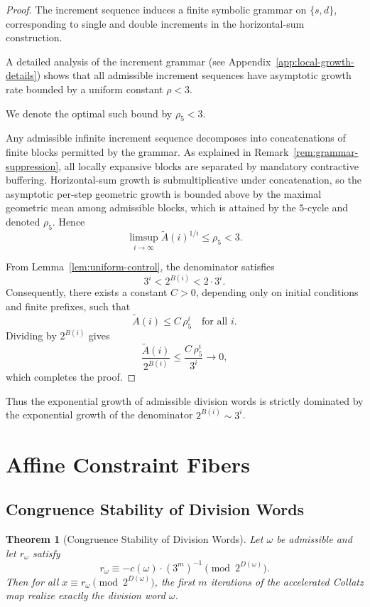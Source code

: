 \documentclass[12pt, oneside]{article}
\numberwithin{equation}{section}
\theoremstyle{definition}
\theoremstyle{plain}
\newtheorem{theorem}{Theorem}[section]
\theoremstyle{remark}
\begin{document}
\begin{proof}
The increment sequence  induces a finite symbolic grammar on $\{s,d\}$,
corresponding to single and double increments in the horizontal-sum construction.

A detailed analysis of the increment grammar (see Appendix~\ref{app:local-growth-details})
shows that all admissible increment sequences have asymptotic growth rate bounded by a
uniform constant $\rho < 3$.

We denote the optimal such bound by $\rho_5 < 3$.

Any admissible infinite increment sequence decomposes into concatenations of finite
blocks permitted by the grammar. As explained in Remark~\ref{rem:grammar-suppression},
all locally expansive blocks are separated by mandatory contractive buffering. Horizontal-sum
growth is submultiplicative under concatenation, so the asymptotic per-step geometric
growth is bounded above by the maximal geometric mean among admissible blocks, which is
attained by the $5$-cycle and denoted $\rho_5$. Hence
\[
\limsup_{i\to\infty} \widetilde A(i)^{1/i} \le \rho_5 < 3.
\]

From Lemma~\ref{lem:uniform-control}, the denominator satisfies
\[
3^i < 2^{B(i)} < 2\cdot 3^i.
\]
Consequently, there exists a constant $C>0$, depending only on initial conditions
and finite prefixes, such that
\[
\widetilde A(i) \le C\,\rho_5^i \quad \text{for all } i.
\]
Dividing by $2^{B(i)}$ gives
\[
\frac{\widetilde A(i)}{2^{B(i)}} \le \frac{C\,\rho_5^i}{3^i} \longrightarrow 0,
\]
which completes the proof.
\end{proof}

Thus the exponential growth of admissible division words is strictly dominated
by the exponential growth of the denominator $2^{B(i)} \sim 3^i$.

\section{Affine Constraint Fibers}
\label{sec:affine-constraint-fibers}

\subsection{Congruence Stability of Division Words}

\begin{theorem}[Congruence Stability of Division Words]
Let $\omega$ be admissible and let $r_\omega$ satisfy
\[
r_\omega \equiv -c(\omega)\cdot (3^m)^{-1} \pmod{2^{D(\omega)}}.
\]
Then for all $x \equiv r_\omega \pmod{2^{D(\omega)}}$, the first $m$
iterations of the accelerated Collatz map realize exactly the division word $\omega$.
\end{theorem}
\end{document}
